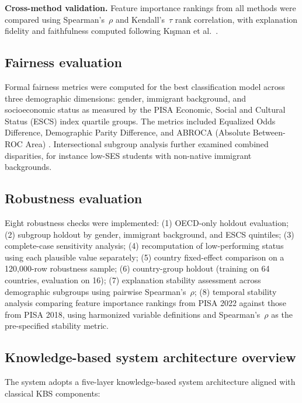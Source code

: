 \documentclass[review,12pt]{elsarticle}
\begin{document}
\textbf{Cross-method validation.} Feature importance rankings from all methods were compared using Spearman's~$\rho$ and Kendall's~$\tau$ rank correlation, with explanation fidelity and faithfulness computed following Kı\c{s}man et al.\ \citep{Kisman_2026}.

\subsection{Fairness evaluation}

Formal fairness metrics were computed for the best classification model across three demographic dimensions: gender, immigrant background, and socioeconomic status as measured by the PISA Economic, Social and Cultural Status (ESCS) index quartile groups. The metrics included Equalized Odds Difference, Demographic Parity Difference, and ABROCA (Absolute Between-ROC Area) \citep{Li_2025}. Intersectional subgroup analysis further examined combined disparities, for instance low-SES students with non-native immigrant backgrounds.

\subsection{Robustness evaluation}

Eight robustness checks were implemented: (1) OECD-only holdout evaluation; (2) subgroup holdout by gender, immigrant background, and ESCS quintiles; (3) complete-case sensitivity analysis; (4) recomputation of low-performing status using each plausible value separately; (5) country fixed-effect comparison on a 120,000-row robustness sample; (6) country-group holdout (training on 64 countries, evaluation on 16);
(7) explanation stability assessment across demographic subgroups using pairwise Spearman's~$\rho$; (8) temporal stability analysis comparing feature importance rankings from PISA 2022 against those from PISA 2018, using harmonized variable definitions and Spearman's~$\rho$ as the pre-specified stability metric.

\subsection{Knowledge-based system architecture overview}

The system adopts a five-layer knowledge-based system architecture aligned with classical KBS components:
\end{document}
